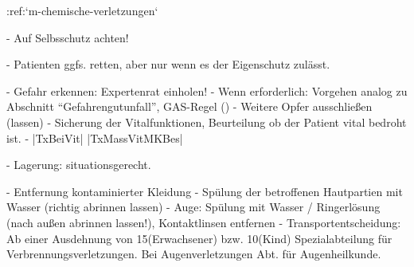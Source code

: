 :ref:`m-chemische-verletzungen`
\begin{enumerate}
  -   Auf Selbsschutz achten!
  \begin{itemize}
    -   Patienten ggfs. retten, aber nur wenn es der
    Eigenschutz zulässt.
  \end{itemize}
  -   Gefahr erkennen:   Expertenrat einholen!
  -   Wenn erforderlich: Vorgehen analog zu Abschnitt
  \enquote{Gefahrengutunfall}, GAS-Regel
  ()
  -   Weitere Opfer ausschließen (lassen)
  -   Sicherung der Vitalfunktionen, Beurteilung ob der
  Patient vital bedroht ist.
  -   |TxBeiVit| |TxMassVitMKBes|
  \begin{itemize}
    -   Lagerung: situationsgerecht.
  \end{itemize}
  -   Entfernung kontaminierter Kleidung
  -   Spülung der betroffenen Hautpartien mit Wasser  (richtig abrinnen
  lassen)
  -   Auge: Spülung mit Wasser / Ringerlösung (nach außen abrinnen
  lassen!),  Kontaktlinsen entfernen
  -   Transportentscheidung: Ab einer Ausdehnung von
  15\PC* (Erwachsener) bzw. 10\PC* (Kind) Spezialabteilung
  für Verbrennungsverletzungen. Bei Augenverletzungen Abt.
  für Augenheilkunde.
\end{enumerate}